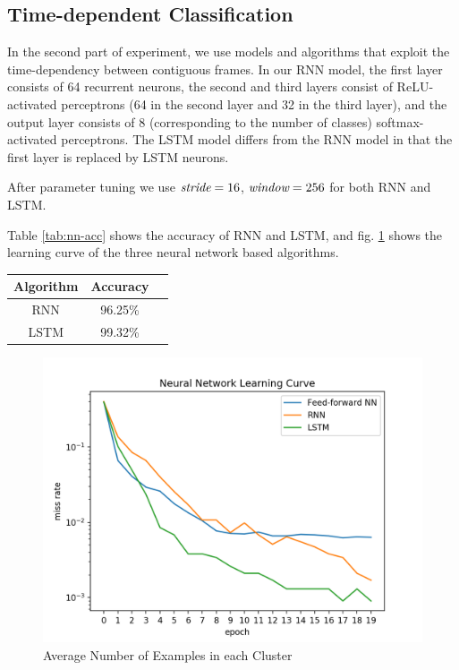 \documentclass[letterpaper, 10pt, conference]{ieeeconf}
\begin{document}
\subsection{Time-dependent Classification}

In the second part of experiment, we use models and algorithms that exploit the time-dependency between contiguous frames. In our RNN model, the first layer consists of 64 recurrent neurons, the second and third layers consist of ReLU-activated perceptrons (64 in the second layer and 32 in the third layer), and the output layer consists of 8 (corresponding to the number of classes) softmax-activated perceptrons. The LSTM model differs from the RNN model in that the first layer is replaced by LSTM neurons. 

After parameter tuning we use $\emph{stride}=16$, $\emph{window}=256$ for both RNN and LSTM. 

Table \ref{tab:nn-acc} shows the accuracy of RNN and LSTM, and fig. \ref{fig:nn-curve} shows the learning curve of the three neural network based algorithms. 

\begin{center}
    \begin{tabular}{|c|c|c|}
        \hline
        Algorithm & Accuracy \\
        \hline
        RNN & 96.25\% \\
        \hline
        LSTM & 99.32\% \\
        \hline
    \end{tabular}
    \label{tab:nn-acc}
\end{center}

\begin{figure}[h!]
	\centering
 	\includegraphics[scale=0.6]{nn_acc.png}
	\caption{Average Number of Examples in each Cluster}
    \label{fig:nn-curve}
\end{figure}
\end{document}
